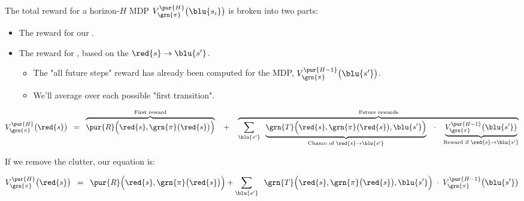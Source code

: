         \begin{kequation}
            The total reward for a horizon-$H$ MDP $V_{\grn{\pi}}^{\pur{H}}\big(\blu{s_i} \big)$ is broken into two parts:

            \begin{itemize}
                \item The reward for our .
                \item The reward for , based on the  $\red{s}\to\blu{s'}$.
                    \begin{itemize}
                        \item The "all future steps" reward has already been computed for the  MDP, $V_{\grn{\pi}}^{\pur{H-1}}\big(\blu{s'} \big)$.
                        \item We'll average over each possible "first transition".
                    \end{itemize}
            \end{itemize}

            \begin{equation*}
                V_{\grn{\pi}}^{\pur{H}}\big(\red{s} \big) \;\;=\;\; 
                \overbrace{
                    \pur{R} \Big( \red{s},\grn{\pi}\big(\red{s}\big) \Big)
                }^{\text{First reward}} 
                \quad+\quad
                \overbrace{
                \sum_{\blu{s'}}  
                        \;\;
                        \underbrace{
                            \grn{T} \Big(   
                            \red{s},\grn{\pi}\big(\red{s}\big),\blu{s'} \Big)
                        }_{\text{Chance of } \red{s} \to \blu{s'}}
                        \;\;\; \cdot \;\;\; 
                        \underbrace{
                            V_{\grn{\pi}}^{\pur{H-1}}\big(\blu{s'} \big)
                        }_{\text{Reward if } \red{s} \to \blu{s'}}
                }^{\text{Future rewards}}
            \end{equation*}
        \end{kequation}

        If we remove the clutter, our equation is:

        \begin{equation}
            V_{\grn{\pi}}^{\pur{H}}\big(\red{s} \big) \;\;=\;\; 
                \pur{R} \Big( \red{s},\grn{\pi}\big(\red{s}\big) \Big) +
            \sum_{\blu{s'}}  
                    \;\;
                    \grn{T} \Big(          \red{s},\grn{\pi}\big(\red{s}\big),\blu{s'} \Big)
                    \;\cdot\; 
                    V_{\grn{\pi}}^{\pur{H-1}}\big(\blu{s'} \big)
        \end{equation}

